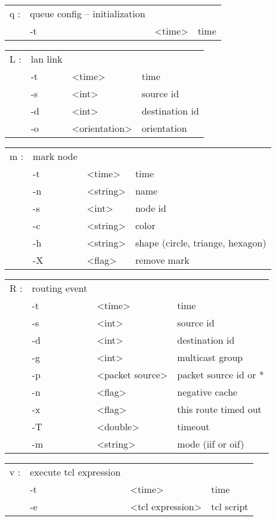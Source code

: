  \begin{tabular}{llll}
  q : & queue config -- initialization & & \\
    &  -t & <time> & time \\
  \end{tabular}

  \begin{tabular}{llll}
  L : & lan link & & \\
    &  -t & <time> & time \\
    &  -s & <int> & source id \\
    &  -d & <int> & destination id \\
    &  -o & <orientation> & orientation \\
  \end{tabular}

  \begin{tabular}{llll}
  m : & mark node & & \\
    &  -t & <time> & time \\
    &  -n & <string> & name \\
    &  -s & <int> & node id \\
    &  -c & <string> & color \\
    &  -h & <string> & shape (circle, triange, hexagon) \\
    &  -X & <flag> & remove mark \\
  \end{tabular}

  \begin{tabular}{llll}
  R : & routing event & & \\
    &  -t & <time> & time \\
    &  -s & <int> & source id \\
    &  -d & <int> & destination id \\
    &  -g & <int> & multicast group \\
    &  -p & <packet source> & packet source id or * \\
    &  -n & <flag> & negative cache \\
    &  -x & <flag> & this route timed out \\
    &  -T & <double> & timeout \\
    &  -m & <string> & mode (iif or oif) \\
  \end{tabular}

  \begin{tabular}{llll}
  v : & execute tcl expression & & \\
    &  -t & <time> & time \\
    &  -e & <tcl expression> & tcl script \\
  \end{tabular}

